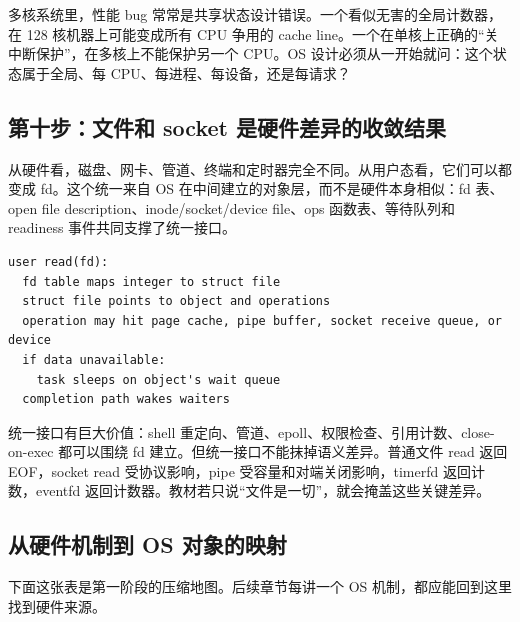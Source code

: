 多核系统里，性能 bug 常常是共享状态设计错误。一个看似无害的全局计数器，在 128 核机器上可能变成所有 CPU 争用的 cache line。一个在单核上正确的“关中断保护”，在多核上不能保护另一个 CPU。OS 设计必须从一开始就问：这个状态属于全局、每 CPU、每进程、每设备，还是每请求？

\subsection{第十步：文件和 socket 是硬件差异的收敛结果}

从硬件看，磁盘、网卡、管道、终端和定时器完全不同。从用户态看，它们可以都变成 fd。这个统一来自 OS 在中间建立的对象层，而不是硬件本身相似：fd 表、open file description、inode/socket/device file、ops 函数表、等待队列和 readiness 事件共同支撑了统一接口。

\begin{lstlisting}
user read(fd):
  fd table maps integer to struct file
  struct file points to object and operations
  operation may hit page cache, pipe buffer, socket receive queue, or device
  if data unavailable:
    task sleeps on object's wait queue
  completion path wakes waiters
\end{lstlisting}

统一接口有巨大价值：shell 重定向、管道、epoll、权限检查、引用计数、close-on-exec 都可以围绕 fd 建立。但统一接口不能抹掉语义差异。普通文件 read 返回 EOF，socket read 受协议影响，pipe 受容量和对端关闭影响，timerfd 返回计数，eventfd 返回计数器。教材若只说“文件是一切”，就会掩盖这些关键差异。

\subsection{从硬件机制到 OS 对象的映射}

下面这张表是第一阶段的压缩地图。后续章节每讲一个 OS 机制，都应能回到这里找到硬件来源。

